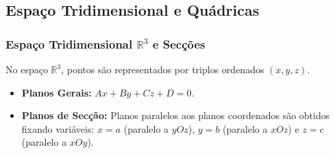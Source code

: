 \documentclass[11pt,a4paper]{article}
\begin{document}
\newpage

\subsection{Espaço Tridimensional e Quádricas}

\subsubsection{Espaço Tridimensional \texorpdfstring{$\mathbb{R}^3$}{R\textasciicircum 3} e Secções}
No espaço $\mathbb{R}^3$, pontos são representados por triplos ordenados $(x,y,z)$.
\begin{itemize}
  \item \textbf{Planos Gerais:} $Ax + By + Cz + D = 0$.
  \item \textbf{Planos de Secção:} Planos paralelos aos planos coordenados são obtidos fixando variáveis: $x = a$ (paralelo a $yOz$), $y = b$ (paralelo a $xOz$) e $z = c$ (paralelo a $xOy$).
\end{itemize}
\end{document}
